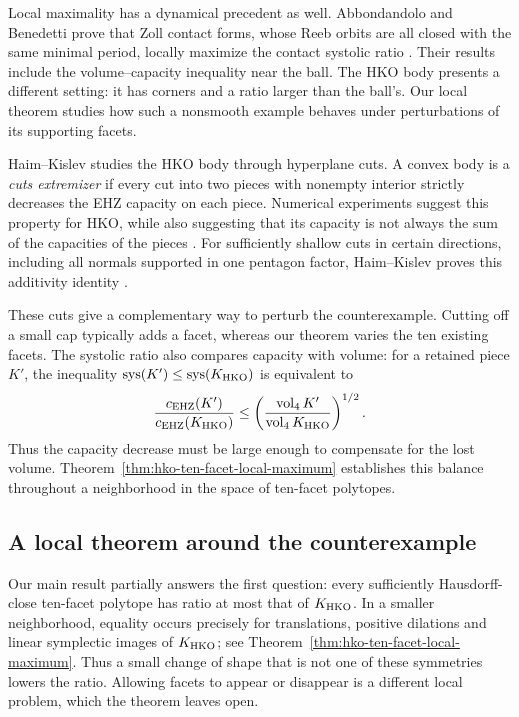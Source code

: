 Local maximality has a dynamical precedent as well. Abbondandolo and
Benedetti prove that Zoll contact forms, whose Reeb orbits are all closed
with the same minimal period, locally maximize the contact systolic ratio
\cite{AB2023}. Their results include the volume--capacity inequality near
the ball. The HKO body presents a different setting: it has corners and a
ratio larger than the ball's. Our local theorem studies how such a
nonsmooth example behaves under perturbations of its supporting facets.

Haim--Kislev studies the HKO body through hyperplane cuts. A convex body is
a \emph{cuts extremizer} if every cut into two pieces with nonempty interior
strictly decreases the EHZ capacity on each piece. Numerical experiments
suggest this property for HKO, while also suggesting that its capacity is
not always the sum of the capacities of the pieces
\cite[Definitions~1.1--1.2 and Example~1.12]{HaimKislev2025Zoll}.
For sufficiently shallow cuts in certain directions, including all normals
supported in one pentagon factor, Haim--Kislev proves this additivity identity
\cite[Proposition~1.13]{HaimKislev2025Zoll}.

These cuts give a complementary way to perturb the counterexample. Cutting
off a small cap typically adds a facet, whereas our theorem varies the ten
existing facets. The systolic ratio also compares capacity with volume: for
a retained piece $K'$, the inequality
$\operatorname{sys}(K')\leq\operatorname{sys}(K_{\rm HKO})$ is equivalent to
\[
 \frac{c_{\rm EHZ}(K')}{c_{\rm EHZ}(K_{\rm HKO})}
 \leq
 \left(\frac{\operatorname{vol}_4 K'}
 {\operatorname{vol}_4 K_{\rm HKO}}\right)^{1/2}.
\]
Thus the capacity decrease must be large enough to compensate for the lost
volume. Theorem~\ref{thm:hko-ten-facet-local-maximum} establishes this
balance throughout a neighborhood in the space of ten-facet polytopes.

\subsection{A local theorem around the counterexample}

Our main result partially answers the first question: every sufficiently
Hausdorff-close ten-facet polytope has ratio at most
that of $K_{\rm HKO}$. In a smaller neighborhood, equality occurs precisely
for translations, positive dilations and linear symplectic images of
$K_{\rm HKO}$; see Theorem~\ref{thm:hko-ten-facet-local-maximum}. Thus a
small change of shape that is not one of these symmetries lowers the ratio.
Allowing facets to appear or disappear is a different local problem, which
the theorem leaves open.


